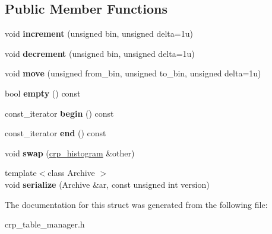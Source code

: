 \subsection*{Public Member Functions}
\begin{DoxyCompactItemize}
\item 
\mbox{\label{structcpyp_1_1crp__histogram_a5ce87759eb719a5351fb3c848466fb35}} 
void {\bfseries increment} (unsigned bin, unsigned delta=1u)
\item 
\mbox{\label{structcpyp_1_1crp__histogram_aa8e6780d9a0f90ab55170e9b4174c6dd}} 
void {\bfseries decrement} (unsigned bin, unsigned delta=1u)
\item 
\mbox{\label{structcpyp_1_1crp__histogram_a259460b5e865556c7f6cd889f4d42988}} 
void {\bfseries move} (unsigned from\+\_\+bin, unsigned to\+\_\+bin, unsigned delta=1u)
\item 
\mbox{\label{structcpyp_1_1crp__histogram_a93ab8ae0ee2b7b7a6086db9c4ca5575b}} 
bool {\bfseries empty} () const
\item 
\mbox{\label{structcpyp_1_1crp__histogram_ad7b36d4a17f37df99e01ef1c88aa8c28}} 
const\+\_\+iterator {\bfseries begin} () const
\item 
\mbox{\label{structcpyp_1_1crp__histogram_a73d7a1307d38d7a6762018bacf8ab222}} 
const\+\_\+iterator {\bfseries end} () const
\item 
\mbox{\label{structcpyp_1_1crp__histogram_a983bf3dd7524255035dff2dc6de92337}} 
void {\bfseries swap} (\mbox{\hyperlink{structcpyp_1_1crp__histogram}{crp\+\_\+histogram}} \&other)
\item 
\mbox{\label{structcpyp_1_1crp__histogram_ab208740a8f29d565566b8b0e37396861}} 
{\footnotesize template$<$class Archive $>$ }\\void {\bfseries serialize} (Archive \&ar, const unsigned int version)
\end{DoxyCompactItemize}


The documentation for this struct was generated from the following file\+:\begin{DoxyCompactItemize}
\item 
crp\+\_\+table\+\_\+manager.\+h\end{DoxyCompactItemize}
